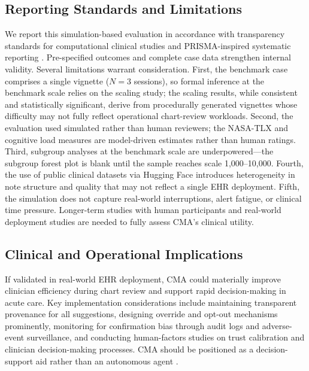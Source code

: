 \documentclass[preprint,12pt]{elsarticle}
\begin{document}
\subsection{Reporting Standards and Limitations}
We report this simulation-based evaluation in accordance with transparency standards for computational clinical studies and PRISMA-inspired systematic reporting \citep{moher09}. Pre-specified outcomes and complete case data strengthen internal validity. Several limitations warrant consideration. First, the benchmark case comprises a single vignette ($N=3$ sessions), so formal inference at the benchmark scale relies on the scaling study; the scaling results, while consistent and statistically significant, derive from procedurally generated vignettes whose difficulty may not fully reflect operational chart-review workloads. Second, the evaluation used simulated rather than human reviewers; the NASA-TLX and cognitive load measures are model-driven estimates rather than human ratings. Third, subgroup analyses at the benchmark scale are underpowered---the subgroup forest plot is blank until the sample reaches scale 1{,}000--10{,}000. Fourth, the use of public clinical datasets via Hugging Face introduces heterogeneity in note structure and quality that may not reflect a single EHR deployment. Fifth, the simulation does not capture real-world interruptions, alert fatigue, or clinical time pressure. Longer-term studies with human participants and real-world deployment studies are needed to fully assess CMA's clinical utility.

\subsection{Clinical and Operational Implications}
If validated in real-world EHR deployment, CMA could materially improve clinician efficiency during chart review and support rapid decision-making in acute care. Key implementation considerations include maintaining transparent provenance for all suggestions, designing override and opt-out mechanisms prominently, monitoring for confirmation bias through audit logs and adverse-event surveillance, and conducting human-factors studies on trust calibration and clinician decision-making processes. CMA should be positioned as a decision-support aid rather than an autonomous agent \citep{li25}.
\end{document}
